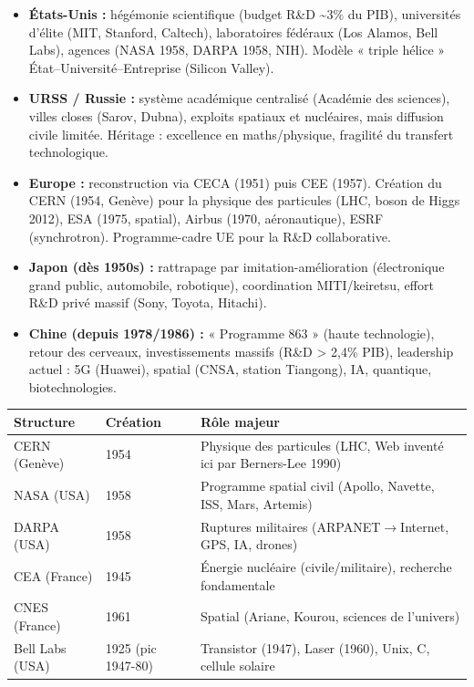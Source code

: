 \documentclass[11pt]{article}
\newcommand{\cle}[1]{{\popxbold\color{popdark}#1}}
\begin{document}
\begin{itemize}
    \item \textbf{États-Unis :} hégémonie scientifique (budget R\&D \textasciitilde 3\% du PIB), universités d'élite (MIT, Stanford, Caltech), laboratoires fédéraux (Los Alamos, Bell Labs), agences (NASA 1958, DARPA 1958, NIH). Modèle « triple hélice » État–Université–Entreprise (Silicon Valley).
    \item \textbf{URSS / Russie :} système académique centralisé (Académie des sciences), villes closes (Sarov, Dubna), exploits spatiaux et nucléaires, mais diffusion civile limitée. Héritage : excellence en maths/physique, fragilité du transfert technologique.
    \item \textbf{Europe :} reconstruction via \cle{CECA} (1951) puis \cle{CEE} (1957). Création du \cle{CERN} (1954, Genève) pour la physique des particules (LHC, boson de Higgs 2012), \cle{ESA} (1975, spatial), \cle{Airbus} (1970, aéronautique), \cle{ESRF} (synchrotron). Programme-cadre UE pour la R\&D collaborative.
    \item \textbf{Japon (dès 1950s) :} rattrapage par imitation-amélioration (électronique grand public, automobile, robotique), coordination MITI/keiretsu, effort R\&D privé massif (Sony, Toyota, Hitachi).
    \item \textbf{Chine (depuis 1978/1986) :} « Programme 863 » (haute technologie), retour des cerveaux, investissements massifs (R\&D > 2,4\% PIB), leadership actuel : 5G (Huawei), spatial (CNSA, station Tiangong), IA, quantique, biotechnologies.
\end{itemize}

\begin{aretenir}
\begin{center}
\begin{tabularx}{\linewidth}{|l|X|X|}\hline
\rowcolor{popblueL}
\textbf{Structure} & \textbf{Création} & \textbf{Rôle majeur} \\\hline
CERN (Genève) & 1954 & Physique des particules (LHC, Web inventé ici par Berners-Lee 1990) \\\hline
NASA (USA) & 1958 & Programme spatial civil (Apollo, Navette, ISS, Mars, Artemis) \\\hline
DARPA (USA) & 1958 & Ruptures militaires (ARPANET$\to$Internet, GPS, IA, drones) \\\hline
CEA (France) & 1945 & Énergie nucléaire (civile/militaire), recherche fondamentale \\\hline
CNES (France) & 1961 & Spatial (Ariane, Kourou, sciences de l'univers) \\\hline
Bell Labs (USA) & 1925 (pic 1947-80) & Transistor (1947), Laser (1960), Unix, C, cellule solaire \\\hline
\end{tabularx}
\end{center}
\end{aretenir}
\end{document}
